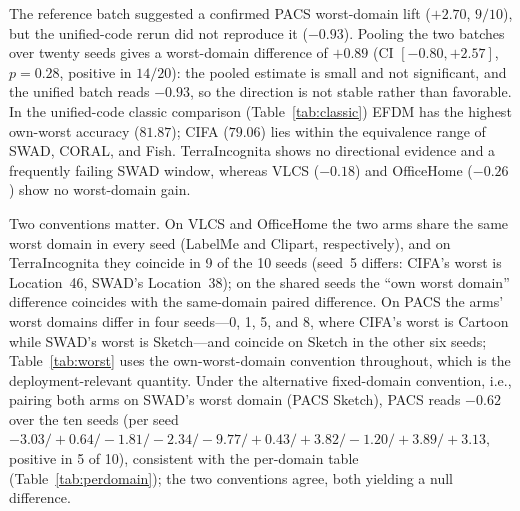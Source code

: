 \documentclass[electronics,article,submit,moreauthors]{Definitions/mdpi}
\newcommand{\add}[1]{\textcolor{addblue}{#1}}
\newcommand{\del}[1]{\textcolor{delred}{\st{#1}}}
\def\add#1{#1}%
\def\del#1{}%
\renewcommand{\add}[1]{#1}
\renewcommand{\del}[1]{}
\begin{document}
The reference batch suggested a confirmed PACS worst-domain lift ($+2.70$, $9/10$), but the unified-code rerun did not reproduce it ($-0.93$). Pooling the two batches over twenty seeds gives a worst-domain difference of $+0.89$ (CI $[-0.80,+2.57]$, $p=0.28$, positive in $14/20$): \del{the direction is favorable and larger than the overall difference, consistent with the worst-case-oriented design, yet it is not statistically confirmed.}\add{the pooled estimate is small and not significant, and the unified batch reads $-0.93$, so the direction is not stable rather than favorable.} In the unified-code classic comparison (Table~\ref{tab:classic}) EFDM has the highest own-worst accuracy ($81.87$); CIFA ($79.06$) lies within the equivalence range of SWAD, CORAL, and Fish. \del{TerraIncognita likewise keeps a positive but unconfirmed direction ($+2.23$, $7/10$), whereas VLCS}\add{TerraIncognita shows no directional evidence and a frequently failing SWAD window, whereas VLCS} ($-0.18$) and OfficeHome ($-0.26$) show no worst-domain gain.

Two conventions matter. On VLCS and OfficeHome the two arms share the same worst domain in every seed (LabelMe and Clipart, respectively), and on TerraIncognita they coincide in 9 of the 10 seeds (seed~5 differs: CIFA's worst is Location~46, SWAD's Location~38); on the shared seeds the ``own worst domain'' difference coincides with the same-domain paired difference. On PACS the arms' worst domains differ in four seeds---0, 1, 5, and 8, where CIFA's worst is Cartoon while SWAD's worst is Sketch---and coincide on Sketch in the other six seeds; Table~\ref{tab:worst} uses the own-worst-domain convention throughout, which is the deployment-relevant quantity. Under the alternative fixed-domain convention, i.e., pairing both arms on SWAD's worst domain (PACS Sketch), \del{PACS reads $+3.14$ over the ten seeds (per seed $+3.72/+3.82/+0.74/+6.26/+4.00/+6.29/+3.59/-1.96/+2.77/+2.16$, positive in 9 of 10), the figure reported in the abstract and the per-domain table; the two conventions agree in direction.}\add{PACS reads $-0.62$ over the ten seeds (per seed $-3.03/+0.64/-1.81/-2.34/-9.77/+0.43/+3.82/-1.20/+3.89/+3.13$, positive in 5 of 10), consistent with the per-domain table (Table~\ref{tab:perdomain}); the two conventions agree, both yielding a null difference.}
\end{document}
